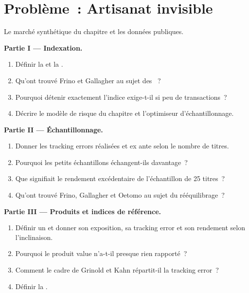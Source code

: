 \section{Problème~: Artisanat invisible}

\begin{problem}\label{pb:s1:the-asset-managers-strategies:1}
Le marché synthétique du chapitre et les données publiques.

\medskip\noindent\textbf{Partie I --- Indexation.}
\begin{enumerate}
\item Définir la  et la .
\item Qu'ont trouvé Frino et Gallagher au sujet des ~?
\item Pourquoi détenir exactement l'indice exige-t-il si peu de transactions~?
\item Décrire le modèle de risque du chapitre et l'optimiseur d'échantillonnage.
\end{enumerate}

\medskip\noindent\textbf{Partie II --- Échantillonnage.}
\begin{enumerate}[resume]
\item Donner les tracking errors réalisées et ex ante selon le nombre de titres.
\item Pourquoi les petits échantillons échangent-ils davantage~?
\item Que signifiait le rendement excédentaire de l'échantillon de 25 titres~?
\item Qu'ont trouvé Frino, Gallagher et Oetomo au sujet du rééquilibrage~?
\end{enumerate}

\medskip\noindent\textbf{Partie III --- Produits et indices de référence.}
\begin{enumerate}[resume]
\item Définir un  et donner son exposition, sa tracking error et son rendement selon l'inclinaison.
\item Pourquoi le produit value n'a-t-il presque rien rapporté~?
\item Comment le cadre de Grinold et Kahn répartit-il la tracking error~?
\item Définir la .
\end{enumerate}


\end{problem}

